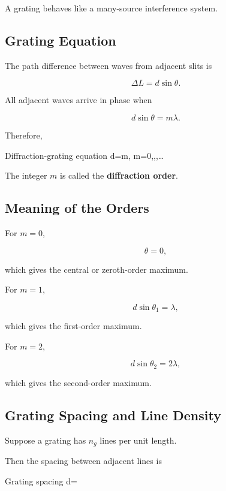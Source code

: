 \documentclass{studentnotes}
\begin{document}
A grating behaves like a many-source interference system.

\subsection{Grating Equation}

The path difference between waves from adjacent slits is

\[
    \Delta L=d\sin\theta.
\]

All adjacent waves arrive in phase when

\[
    d\sin\theta=m\lambda.
\]

Therefore,

\begin{namedformula}{Diffraction-grating equation}
    d\sin\theta=m\lambda,
    \qquad
    m=0,,,\ldots
\end{namedformula}

The integer \(m\) is called the \textbf{diffraction order}.

\subsection{Meaning of the Orders}

For \(m=0\),

\[
    \theta=0,
\]

which gives the central or zeroth-order maximum.

For \(m=1\),

\[
    d\sin\theta_1=\lambda,
\]

which gives the first-order maximum.

For \(m=2\),

\[
    d\sin\theta_2=2\lambda,
\]

which gives the second-order maximum.

\subsection{Grating Spacing and Line Density}

Suppose a grating has \(n_g\) lines per unit length.

Then the spacing between adjacent lines is

\begin{namedformula}{Grating spacing}
    d=
\end{namedformula}
\end{document}
